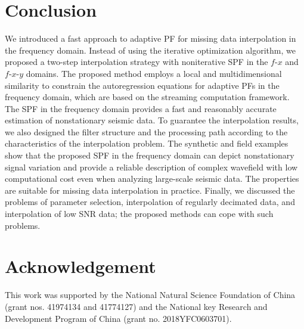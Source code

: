 \section{Conclusion}

We introduced a fast approach to adaptive PF for missing data
interpolation in the frequency domain.  Instead of using the iterative
optimization algorithm, we proposed a two-step interpolation strategy
with noniterative SPF in the $f$-$x$ and $f$-$x$-$y$ domains.  The
proposed method employs a local and multidimensional similarity to
constrain the autoregression equations for adaptive PFs in the
frequency domain, which are based on the streaming computation
framework. The SPF in the frequency domain provides a fast and
reasonably accurate estimation of nonstationary seismic data.  To
guarantee the interpolation results, we also designed the filter
structure and the processing path according to the characteristics of
the interpolation problem. The synthetic and field examples show that
the proposed SPF in the frequency domain can depict nonstationary
signal variation and provide a reliable description of complex
wavefield with low computational cost even when analyzing large-scale
seismic data. The properties are suitable for missing data
interpolation in practice. Finally, we discussed the problems of
parameter selection, interpolation of regularly decimated data, and
interpolation of low SNR data; the proposed methods can cope with such
problems.

\section{Acknowledgement}
This work was supported by the National Natural Science Foundation of
China (grant nos. 41974134 and 41774127) and the National key Research
and Development Program of China (grant no. 2018YFC0603701).



